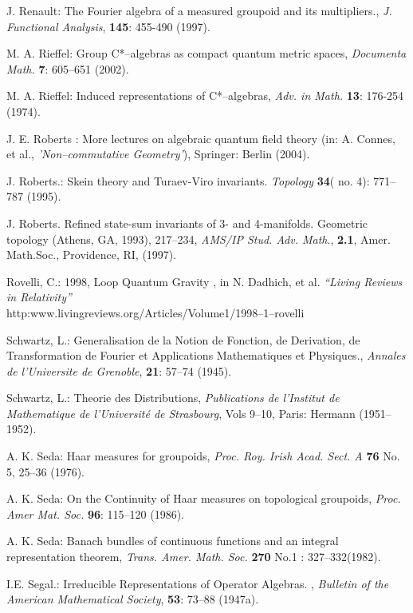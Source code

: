 \documentclass[12pt]{article}
\theoremstyle{plain}
\theoremstyle{definition}
\numberwithin{equation}{section}
\newcommand{\<}{{\langle}}
\begin{document}
\begin{thebibliography}{99}
J. Renault: The Fourier algebra of a measured groupoid and its multipliers.,
\textit{J. Functional Analysis}, \textbf{145}: 455-490 (1997).

M. A. Rieffel: Group C*--algebras as compact quantum metric spaces, \emph{Documenta Math.} \textbf{7}: 605--651 (2002).

M. A. Rieffel: Induced representations of  C*--algebras, \emph{Adv. in Math.} \textbf{13}: 176-254 (1974).

J. E. Roberts : More lectures on algebraic quantum field theory (in: A. Connes, et al., \textit{'Non--commutative Geometry'}), Springer: Berlin (2004).

J. Roberts.: Skein theory and Turaev-Viro invariants. \textit{Topology} \textbf{34}( no. 4): 771--787 (1995).

 J. Roberts. Refined state-sum invariants of 3- and 4-manifolds. Geometric topology
(Athens, GA, 1993), 217--234, \textit{AMS/IP Stud. Adv. Math}., \textbf{2.1}, Amer. Math.Soc., Providence, RI, (1997).

Rovelli, C.: 1998, Loop Quantum Gravity , in N. Dadhich, et al. {\em ``Living Reviews in Relativity''} \\
http:www.livingreviews.org/Articles/Volume1/1998--1--rovelli

Schwartz, L.:  Generalisation de la Notion de Fonction, de Derivation, de Transformation
de Fourier et Applications Mathematiques et Physiques., \textit{Annales de l'Universite de Grenoble},
\textbf{21}: 57--74 (1945).

Schwartz, L.: Theorie des Distributions, \emph{Publications de l'Institut de Mathematique
de l'Universit\'e de Strasbourg}, Vols 9--10, Paris: Hermann (1951--1952).

A. K. Seda: Haar measures for groupoids, \emph{Proc. Roy. Irish Acad.
Sect. A} \textbf{76} No. 5, 25--36 (1976).

A. K. Seda: On the Continuity of Haar measures on topological groupoids, \emph{Proc. Amer Mat. Soc.} \textbf{96}: 115--120 (1986).

A. K. Seda: Banach bundles of continuous functions and an integral
representation theorem, \emph{Trans. Amer. Math. Soc.} \textbf{270} No.1 : 327--332(1982).


I.E. Segal.:  Irreducible Representations of Operator Algebras. , 
{\em Bulletin of the American Mathematical Society}, \textbf{53}: 73--88 (1947a).


\end{thebibliography}
\end{document}
